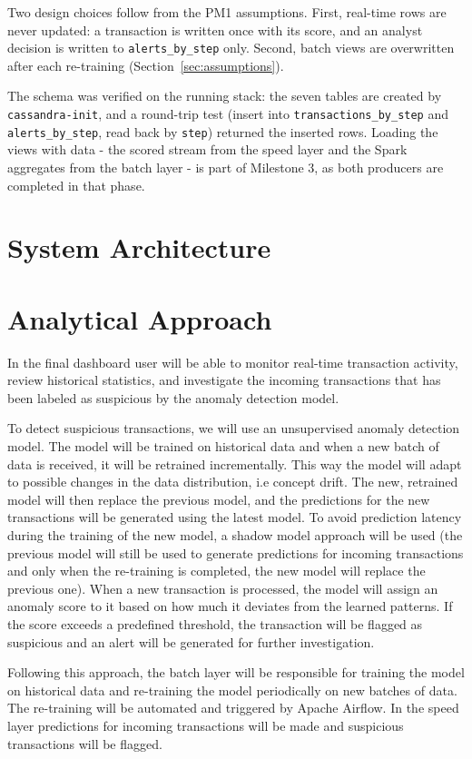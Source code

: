 \documentclass[titlepage]{article}
\begin{document}
Two design choices follow from the PM1 assumptions. First, real-time rows are never updated: a transaction is written once with its score, and an analyst decision is written to \texttt{alerts\_by\_step} only. 
Second, batch views are overwritten after each re-training (Section~\ref{sec:assumptions}).

The schema was verified on the running stack: the seven tables are created by \texttt{cassandra-init}, and a round-trip test (insert into \texttt{transactions\_by\_step} and \texttt{alerts\_by\_step}, read back by \texttt{step}) returned the inserted rows.
Loading the views with data - the scored stream from the speed layer and the Spark aggregates from the batch layer - is part of Milestone 3, as both producers are completed in that phase.


\section{System Architecture}


\section{Analytical Approach}
In the final dashboard user will be able to monitor real-time transaction activity, review historical statistics, and investigate the incoming transactions that has been labeled as suspicious by the anomaly detection model. 

To detect suspicious transactions, we will use an unsupervised anomaly detection model. The model will be trained on historical data and when a new batch of data is received, it will be retrained incrementally. This way the model will adapt to possible changes in the data distribution, i.e concept drift. The new, retrained model will then replace the previous model, and the predictions for the new transactions will be generated using the latest model. 
To avoid prediction latency during the training of the new model, a shadow model approach will be used (the previous model will still be used to generate predictions for incoming transactions and only when the re-training is completed, the new model will replace the previous one).
When a new transaction is processed, the model will assign an anomaly score to it based on how much it deviates from the learned patterns. If the score exceeds a predefined threshold, the transaction will be flagged as suspicious and an alert will be generated for further investigation. 

Following this approach, the batch layer will be responsible for training the model on historical data and re-training the model periodically on new batches of data. The re-training will be automated and triggered by Apache Airflow.
In the speed layer predictions for incoming transactions will be made and suspicious transactions will be flagged. 


\newpage
\listoffigures
\thispagestyle{empty}

\renewcommand{\listtablename}{List of tables}
\listoftables
\thispagestyle{empty}
\end{document}
